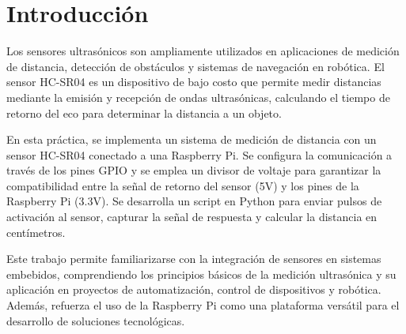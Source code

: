 \section{Introducción}
\noindent
\justifying
Los sensores ultrasónicos son ampliamente utilizados en aplicaciones de medición de distancia, detección de obstáculos y sistemas de navegación en robótica. El sensor HC-SR04 es un dispositivo de bajo costo que permite medir distancias mediante la emisión y recepción de ondas ultrasónicas, calculando el tiempo de retorno del eco para determinar la distancia a un objeto.

En esta práctica, se implementa un sistema de medición de distancia con un sensor HC-SR04 conectado a una Raspberry Pi. Se configura la comunicación a través de los pines GPIO y se emplea un divisor de voltaje para garantizar la compatibilidad entre la señal de retorno del sensor (5V) y los pines de la Raspberry Pi (3.3V). Se desarrolla un script en Python para enviar pulsos de activación al sensor, capturar la señal de respuesta y calcular la distancia en centímetros.

Este trabajo permite familiarizarse con la integración de sensores en sistemas embebidos, comprendiendo los principios básicos de la medición ultrasónica y su aplicación en proyectos de automatización, control de dispositivos y robótica. Además, refuerza el uso de la Raspberry Pi como una plataforma versátil para el desarrollo de soluciones tecnológicas.
